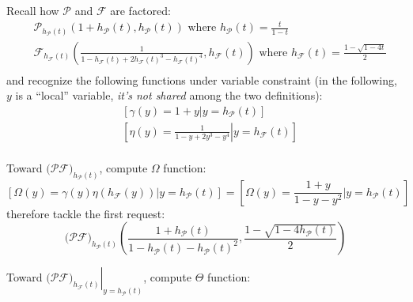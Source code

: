 Recall how $\mathcal{P}$ and $\mathcal{F}$ are factored:
\begin{displaymath}
    \begin{split}
        &\mathcal{P}_{h_{\mathcal{P}}(t)}\left( 1+h_{\mathcal{P}}(t), h_{\mathcal{P}}(t) \right)
            \text{ where } h_{\mathcal{P}}(t) = \frac{t}{1-t}\\
        &\mathcal{F}_{h_{\mathcal{F}}(t)}\left( \frac{1}{1-h_{\mathcal{F}}(t)+
            2h_{\mathcal{F}}(t)^3-h_{\mathcal{F}}(t)^4}, h_{\mathcal{F}}(t) \right)
                \text{ where } h_{\mathcal{F}}(t) = \frac{1-\sqrt{1-4t}}{2}\\
    \end{split}
\end{displaymath}
and recognize the following functions under variable constraint (in the following, $y$
is a ``local'' variable, \emph{it's not shared} among the two definitions):
\begin{displaymath}
    \begin{split}
        &\left[\left.\gamma(y) = 1+y \right| y=h_{\mathcal{P}}(t) \right]\\
        &\left[\left.\eta(y) = \frac{1}{1-y+2y^3-y^4} \right| y=h_{\mathcal{F}}(t) \right]\\
    \end{split}
\end{displaymath}

Toward $\big(\mathcal{P}\mathcal{F}\big)_{h_{\mathcal{P}}(t)}$, compute $\Omega$ function:
\begin{displaymath}
    \left[\Omega(y)= \gamma(y)\eta(h_{\mathcal{F}}(y))| y=h_{\mathcal{P}}(t) \right]
        = \left[\Omega(y)= \frac{1+y}{1-y-y^2}| y=h_{\mathcal{P}}(t) \right]
\end{displaymath}
therefore tackle the first request:
\begin{displaymath}
    \big(\mathcal{P}\mathcal{F}\big)_{h_{\mathcal{P}}(t)} \left(\frac{1+
        h_{\mathcal{P}}(t)}{1-h_{\mathcal{P}}(t)-h_{\mathcal{P}}(t)^2}, \frac{1-\sqrt{1-4h_{\mathcal{P}}(t)}}{2} \right)
\end{displaymath}

Toward $\left.\big(\mathcal{P}\mathcal{F}\big)_{h_{\mathcal{F}}(t)}\right|_{y=h_{\mathcal{P}}(t)}$, compute $\Theta$ function:

